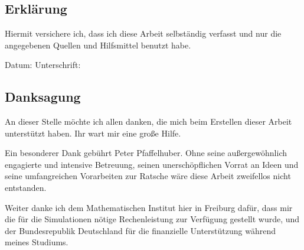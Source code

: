 \chapter*{ }

\thispagestyle{empty}

\section*{Erklärung}
Hiermit versichere ich, dass ich diese Arbeit selbständig verfasst und
nur die angegebenen Quellen und Hilfsmittel benutzt habe.

\vspace{2cm} 
\noindent

Datum: \hspace{5cm} Unterschrift:

\vfill

\section*{Danksagung}
An dieser Stelle möchte ich allen danken, die mich beim Erstellen
dieser Arbeit unterstützt haben. Ihr wart mir eine große Hilfe.

Ein besonderer Dank gebührt Peter Pfaffelhuber.
Ohne seine außergewöhnlich engagierte und intensive Betreuung, seinen
unerschöpflichen Vorrat an Ideen und seine umfangreichen Vorarbeiten zur Ratsche
wäre diese Arbeit zweifellos nicht entstanden.

Weiter danke ich dem Mathematischen Institut hier in Freiburg dafür, dass mir
die für die Simulationen nötige Rechenleistung zur Verfügung gestellt wurde, und
der Bundesrepublik Deutschland für die finanzielle Unterstützung während meines
Studiums.
